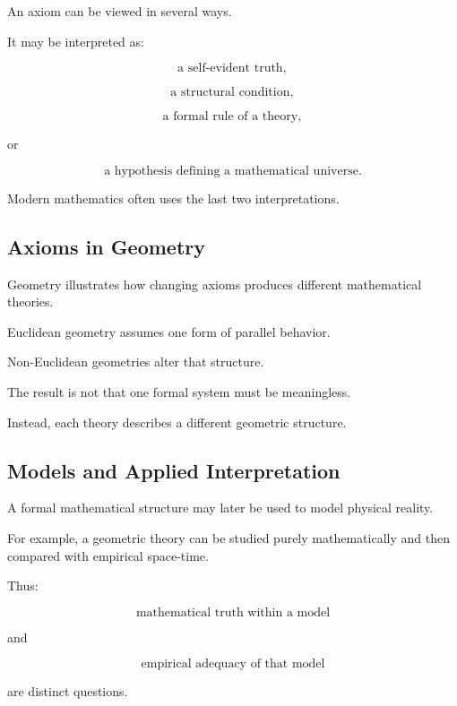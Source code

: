 An axiom can be viewed in several ways.

It may be interpreted as:

\[
\boxed{
\text{a self-evident truth},
}
\]

\[
\boxed{
\text{a structural condition},
}
\]

\[
\boxed{
\text{a formal rule of a theory},
}
\]

or

\[
\boxed{
\text{a hypothesis defining a mathematical universe}.
}
\]

Modern mathematics often uses the last two interpretations.

\subsection{Axioms in Geometry}
\label{subsec:axioms-geometry-philosophy}

Geometry illustrates how changing axioms produces different mathematical
theories.

Euclidean geometry assumes one form of parallel behavior.

Non-Euclidean geometries alter that structure.

The result is not that one formal system must be meaningless.

Instead, each theory describes a different geometric structure.

\subsection{Models and Applied Interpretation}
\label{subsec:models-applied-interpretation}

A formal mathematical structure may later be used to model physical reality.

For example, a geometric theory can be studied purely mathematically and
then compared with empirical space-time.

Thus:

\[
\boxed{
\text{mathematical truth within a model}
}
\]

and

\[
\boxed{
\text{empirical adequacy of that model}
}
\]

are distinct questions.

